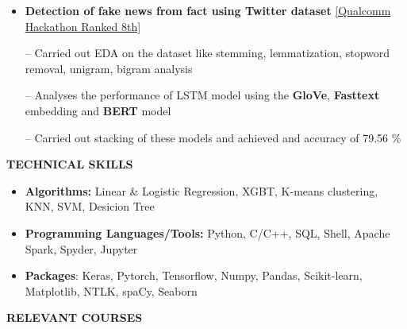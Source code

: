 \documentclass{article}
\begin{document}
\begin{itemize}
\item \textbf{Detection of fake news from fact using Twitter dataset}
\hfill{\href{https://drive.google.com/file/d/1mOlilPLZSuHSyqRIVukRvXs_700Hmz5I/view?usp=sharing}{[Qualcomm Hackathon Ranked 8th]}}
\item[--] Carried out EDA on the dataset like stemming, lemmatization, stopword removal, unigram, bigram analysis
\item[--] Analyses the performance of LSTM model using the \textbf{GloVe}, \textbf{Fasttext} embedding and \textbf{BERT}  model
\item[--] Carried out stacking of these models and achieved and accuracy of 79.56 \%
\end{itemize}


\vspace{-2.7mm}


 \begin{theorem}
   \vspace{-0.7mm}
\begin{center}
\textbf{ TECHNICAL SKILLS
}\end{center}  
\vspace{-0.9mm}    
   \end{theorem}
\vspace{-3 mm}
\begin{itemize}

\item \textbf{Algorithms:} Linear \& Logistic Regression, XGBT, K-means clustering, KNN, SVM, Desicion Tree
 \item \textbf{Programming Languages/Tools:}
 Python, C/C++, SQL, Shell,  Apache Spark, Spyder, Jupyter
\item \textbf{Packages}: Keras, Pytorch, Tensorflow, Numpy, Pandas, Scikit-learn, Matplotlib, NTLK, spaCy, Seaborn

\end{itemize}

\vspace{-3.0mm}

 \begin{theorem}
   \vspace{-0.7mm}
\begin{center}
\textbf{ RELEVANT COURSES
}\end{center}  
\vspace{-0.7mm}    
   \end{theorem}
\vspace{-2.5mm}
\end{document}

